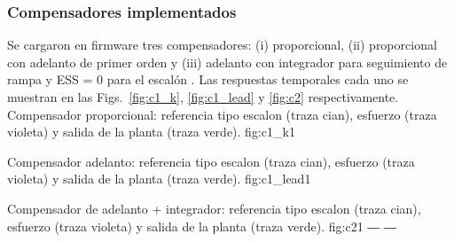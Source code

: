 \subsubsection{Compensadores implementados}
Se cargaron en firmware tres compensadores: (i) proporcional, (ii) proporcional con adelanto de primer orden y (iii) adelanto con integrador para seguimiento de rampa y ESS = 0 para el escalón . Las respuestas temporales cada uno se muestran en las Figs.~\ref{fig:c1_k}, \ref{fig:c1_lead} y \ref{fig:c2} respectivamente.
                                                                        {Compensador proporcional: referencia tipo escalon (traza cian), esfuerzo (traza violeta) y salida de la planta (traza verde).}
                                                                        {fig:c1_k}{1}
                                                                        
                                                                        {Compensador adelanto: referencia tipo escalon (traza cian), esfuerzo (traza violeta) y salida de la planta (traza verde).}
                                                                        {fig:c1_lead}{1}
                                                                        
                                                                        {Compensador de adelanto + integrador: referencia tipo escalon (traza cian), esfuerzo (traza violeta) y salida de la planta (traza verde).}
                                                                        {fig:c2}{1}                                                                                                                              ―
                                                                                                                                                                                                      ―
